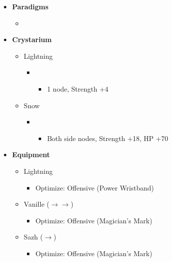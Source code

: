 	\begin{menu}
		\begin{itemize}
			\item \textbf{Paradigms}
			      \begin{itemize}
				      \item {}%
				            {\paradigmline{(\rav)}{\rav}{\rav}}%
				            {\paradigmline{\com}{\sen}{\med}}%
				            {\paradigmline[3]{\textit{[\com]}}{\textit{\com}}{\textit{\rav}}}%
				            {\paradigmline{[\com]}{\com}{\rav}}
			      \end{itemize}
			\item \textbf{Crystarium}
			      \begin{itemize}
				      \item Lightning
				            \begin{itemize}
					            \item \com
					                  \begin{itemize}
						                  \item 1 node, Strength +4
					                  \end{itemize}
				            \end{itemize}
				      \item Snow
				            \begin{itemize}
					            \item \com
					                  \begin{itemize}
						                  \item Both side nodes, Strength +18, HP +70
					                  \end{itemize}
				            \end{itemize}
			      \end{itemize}

			\item \textbf{Equipment}
			      \begin{itemize}
				      \item Lightning
				            \begin{itemize}
					            \item Optimize: Offensive (Power Wristband)
				            \end{itemize}
				      \item Vanille ($\rightarrow \rightarrow$)
				            \begin{itemize}
					            \item Optimize: Offensive (Magician's Mark)
				            \end{itemize}
				      \item Sazh ($\rightarrow$)
				            \begin{itemize}
					            \item Optimize: Offensive (Magician's Mark)
				            \end{itemize}
			      \end{itemize}
		\end{itemize}
	\end{menu}
	\renewcommand{\first}{[1] Tri-Disaster (\rav/\rav/\rav)}

